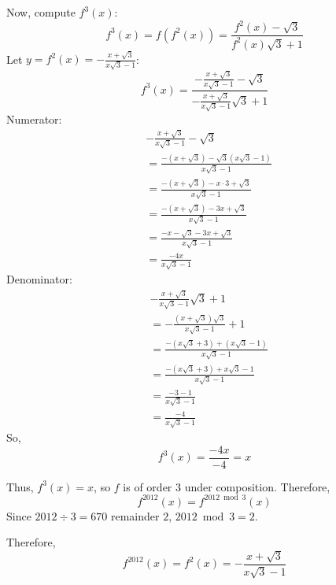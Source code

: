 \documentclass{article}
\begin{document}
Now, compute $f^3(x)$:
\[
f^3(x) = f(f^2(x)) = \frac{f^2(x) - \sqrt{3}}{f^2(x)\sqrt{3} + 1}
\]
Let $y = f^2(x) = -\frac{x + \sqrt{3}}{x\sqrt{3} - 1}$:
\[
f^3(x) = \frac{-\frac{x + \sqrt{3}}{x\sqrt{3} - 1} - \sqrt{3}}{-\frac{x + \sqrt{3}}{x\sqrt{3} - 1}\sqrt{3} + 1}
\]
Numerator:
\begin{align*}
&-\frac{x + \sqrt{3}}{x\sqrt{3} - 1} - \sqrt{3} \\
&= \frac{-(x + \sqrt{3}) - \sqrt{3}(x\sqrt{3} - 1)}{x\sqrt{3} - 1} \\
&= \frac{-(x + \sqrt{3}) - x\cdot 3 + \sqrt{3}}{x\sqrt{3} - 1} \\
&= \frac{-(x + \sqrt{3}) - 3x + \sqrt{3}}{x\sqrt{3} - 1} \\
&= \frac{-x - \sqrt{3} - 3x + \sqrt{3}}{x\sqrt{3} - 1} \\
&= \frac{-4x}{x\sqrt{3} - 1}
\end{align*}
Denominator:
\begin{align*}
&-\frac{x + \sqrt{3}}{x\sqrt{3} - 1}\sqrt{3} + 1 \\
&= -\frac{(x + \sqrt{3})\sqrt{3}}{x\sqrt{3} - 1} + 1 \\
&= \frac{-(x\sqrt{3} + 3) + (x\sqrt{3} - 1)}{x\sqrt{3} - 1} \\
&= \frac{-(x\sqrt{3} + 3) + x\sqrt{3} - 1}{x\sqrt{3} - 1} \\
&= \frac{-3 - 1}{x\sqrt{3} - 1} \\
&= \frac{-4}{x\sqrt{3} - 1}
\end{align*}
So,
\[
f^3(x) = \frac{-4x}{-4} = x
\]

Thus, $f^3(x) = x$, so $f$ is of order $3$ under composition. Therefore,
\[
f^{2012}(x) = f^{2012 \bmod 3}(x)
\]
Since $2012 \div 3 = 670$ remainder $2$, $2012 \bmod 3 = 2$.

Therefore,
\[
\boxed{f^{2012}(x) = f^2(x) = -\frac{x + \sqrt{3}}{x\sqrt{3} - 1}}
\]
\end{document}
